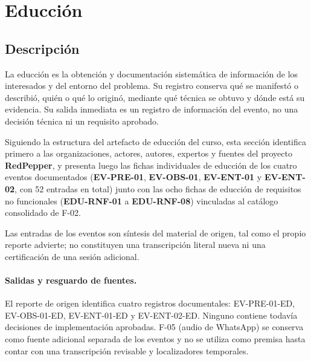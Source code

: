 
\section{Educción}
\label{sec:educcion}

\par\vspace{0.5em}

\subsection{Descripción}
\label{subsec:educcion-descripcion}

La educción es la obtención y documentación sistemática de información de
los interesados y del entorno del problema. Su registro conserva qué se
manifestó o describió, quién o qué lo originó, mediante qué técnica se
obtuvo y dónde está su evidencia. Su salida inmediata es un registro de
información del evento, no una decisión técnica ni un requisito aprobado.

Siguiendo la estructura del artefacto de educción del curso, esta sección
identifica primero a las organizaciones, actores, autores, expertos y
fuentes del proyecto \textbf{RedPepper}, y presenta luego las fichas
individuales de educción de los cuatro eventos documentados
(\textbf{EV-PRE-01}, \textbf{EV-OBS-01}, \textbf{EV-ENT-01} y
\textbf{EV-ENT-02}, con 52 entradas en total) junto con las ocho fichas de
educción de requisitos no funcionales (\textbf{EDU-RNF-01} a
\textbf{EDU-RNF-08}) vinculadas al catálogo consolidado de F-02.

Las entradas de los eventos son síntesis del material de origen, tal como
el propio reporte advierte; no constituyen una transcripción literal nueva
ni una certificación de una sesión adicional.

\paragraph{Salidas y resguardo de fuentes.} El reporte de origen identifica
cuatro registros documentales: EV-PRE-01-ED, EV-OBS-01-ED, EV-ENT-01-ED y
EV-ENT-02-ED. Ninguno contiene todavía decisiones de implementación
aprobadas. F-05 (audio de WhatsApp) se conserva como fuente adicional
separada de los eventos y no se utiliza como premisa hasta contar con una
transcripción revisable y localizadores temporales.

